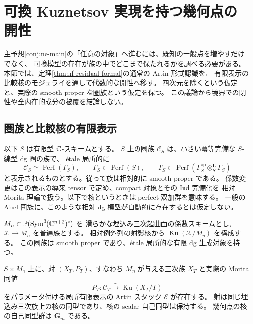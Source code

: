 \section{可換 Kuznetsov 実現を持つ幾何点の開性}
\label{grl:sec:geometric-locus}

主予想\ref{conj:nc-main}の「任意の対象」へ進むには、既知の一般点を増やすだけでなく、
可換模型の存在が族の中でどこまで保たれるかを調べる必要がある。
本節では、定理\ref{thm:nf-residual-formal}の通常の Artin 形式認識を、
有限表示の比較核のモジュライを通して代数的な開性へ移す。
四次元を除くという仮定と、実際の smooth proper な圏族という仮定を保つ。
この議論から境界での閉性や全内在的成分の被覆を結論しない。

\subsection{圏族と比較核の有限表示}

以下 $S$ は有限型 $\mathbb C$-スキームとする。
$S$ 上の圏族 $\mathcal C_S$ は、小さい冪等完備な $S$-線型 dg 圏の族で、
\'etale 局所的に
\[
 \mathcal C_S\simeq\operatorname{Perf}(\Gamma_S),\qquad
 \Gamma_S\in\operatorname{Perf}(S),\qquad
 \Gamma_S\in\operatorname{Perf}(\Gamma_S^{\mathrm{op}}
                      \otimes_S^{\mathbf L}\Gamma_S)
\]
と表示されるものとする。従って族は相対的に smooth proper である。
係数変更はこの表示の導来 tensor で定め、compact 対象とその Ind 完備化を
相対 Morita 理論で扱う。以下で核というときは perfect 双加群を意味する。
一般の Abel 圏族に、このような相対 dg 模型が自動的に存在するとは仮定しない。

$M_n\subset\mathbb P(\operatorname{Sym}^3(\mathbb C^{n+2})^*)$ を
滑らかな埋込み三次超曲面の係数スキームとし、$\mathcal X\to M_n$ を普遍族とする。
相対例外列の射影核から $\operatorname{Ku}(\mathcal X/M_n)$ を構成する。
この圏族は smooth proper であり、\'etale 局所的な有限 dg 生成対象を持つ。

\begin{lemma}[可換比較を表示する核スタック]
\label{grl:lem:comparison-stack}
$S\times M_n$ 上に、対 $(X_T,P_T)$、すなわち
$M_n$ が与える三次族 $X_T$ と実際の Morita 同値
\[
 P_T:\mathcal C_T\xrightarrow{\sim}\operatorname{Ku}(X_T/T)
\]
をパラメータ付ける局所有限表示の Artin スタック $\mathcal E$ が存在する。
射は同じ埋込み三次族上の核の同型であり、核の scalar 自己同型は保持する。
幾何点の核の自己同型群は $\mathbf G_m$ である。
\end{lemma}

